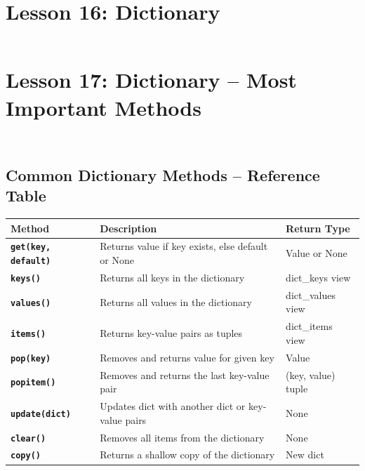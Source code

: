 \documentclass[a4paper,11pt]{article}
\begin{document}
\section{Lesson 16: Dictionary}
\inputminted{python}{Python_Files/dict_basics_guid.py}


\section{Lesson 17: Dictionary – Most Important Methods}
\inputminted{python}{Python_Files/dict_methods_guid.py}

\inputminted{python}{Python_Files/dict_key_value_item_get_examples.py}

\vspace{1em}
\subsection*{Common Dictionary Methods – Reference Table}

\renewcommand{\arraystretch}{1.6}
\begin{tabular}{>{\bfseries}p{4cm} p{6.5cm} p{2.8cm}}
	\toprule
	Method & Description & Return Type \\
	\midrule
	
	\texttt{get(key, default)} & Returns value if key exists, else default or None & Value or None \\
	\texttt{keys()} & Returns all keys in the dictionary & dict\_keys view \\
	\texttt{values()} & Returns all values in the dictionary & dict\_values view \\
	\texttt{items()} & Returns key-value pairs as tuples & dict\_items view \\
	\texttt{pop(key)} & Removes and returns value for given key & Value \\
	\texttt{popitem()} & Removes and returns the last key-value pair & (key, value) tuple \\
	\texttt{update(dict)} & Updates dict with another dict or key-value pairs & None \\
	\texttt{clear()} & Removes all items from the dictionary & None \\
	\texttt{copy()} & Returns a shallow copy of the dictionary & New dict \\
	
	\bottomrule
\end{tabular}


	
	
	
\end{document}
